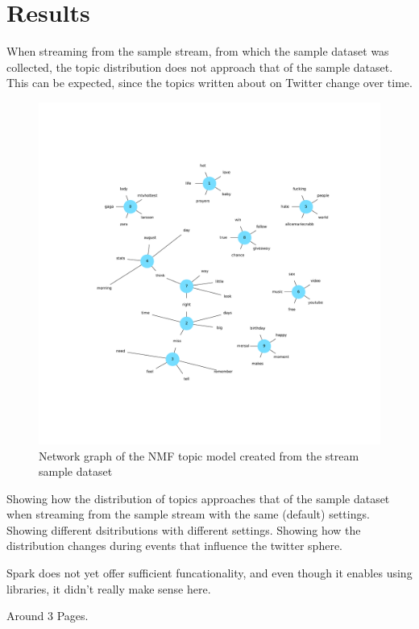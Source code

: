 \chapter{Results}
\label{ch:results}

When streaming from the sample stream, from which the sample dataset was collected,
the topic distribution does not approach that of the sample dataset.
This can be expected, since the topics written about on Twitter change over time.



\begin{figure}
    \centering
    \caption{Network graph of the NMF topic model created from the stream sample dataset}
    \label{fig:nmf_network_graph}
    \includegraphics[width=\textwidth]{../figures/nmf_network_graph.pdf}
\end{figure}

Showing how the distribution of topics approaches that of the sample dataset when streaming from the sample stream with the same (default) settings.
Showing different dsitributions with different settings.
Showing how the distribution changes during events that influence the twitter sphere.

Spark does not yet offer sufficient funcationality,
and even though it enables using libraries,
it didn't really make sense here.

Around 3 Pages.
\pagebreak[3]
